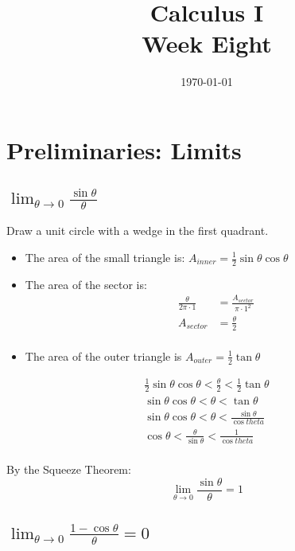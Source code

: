 \documentclass[letterpaper, landscape]{exam}
\author{}
\date{\today}
\title{Calculus I \\ Week Eight}
\begin{document}
  \maketitle
  \tableofcontents

  \section{Preliminaries: Limits} %
  
  \subsection{$\lim_{\theta \to 0} \frac{\sin \theta}{\theta}$} %
  
  Draw a unit circle with a wedge in the first quadrant. 

  \begin{itemize}
    \item The area of the small triangle is: $A_{inner} = \frac{1}{2} \sin \theta \cos \theta$

    \item The area of the sector is:
      \begin{align*}
        \frac{\theta}{2 \pi \cdot 1} &= \frac{A_{sector}}{\pi \cdot 1^2} \\
        A_{sector} &= \frac{\theta}{2} \\
      \end{align*}

    \item The area of the outer triangle is $A_{outer} = \frac{1}{2} \tan \theta$
  \end{itemize}

  \begin{align*}
    \frac{1}{2} \sin \theta \cos \theta < \frac{\theta}{2} < \frac{1}{2} \tan \theta \\
    \sin \theta \cos \theta < \theta < \tan \theta \\
    \sin \theta \cos \theta < \theta < \frac{\sin \theta}{\cos theta} \\
    \cos \theta < \frac{\theta}{\sin \theta} < \frac{1}{\cos theta} \\
  \end{align*}

  By the Squeeze Theorem:
  \[
    \lim_{\theta \to 0} \frac{\sin \theta}{\theta} = 1
  \]

  \subsection{$\lim_{\theta \to 0} \frac{1 - \cos \theta}{\theta} = 0$} %
\end{document}
